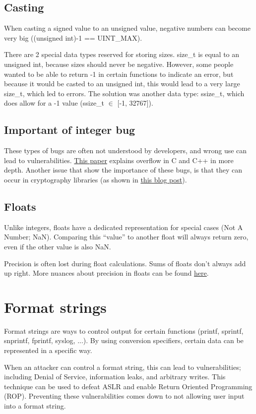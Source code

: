 \documentclass[letterpaper]{article}
\newcommand{\p}{\vspace{1em}\par}		%
\begin{document}
\subsection{Casting}
When casting a signed value to an unsigned value, negative numbers can become very big ((unsigned int)-1 == UINT\_MAX).

\p There are 2 special data types reserved for storing sizes. size\_t is equal to an unsigned int, because sizes should never be negative. However, some people wanted to be able to return -1 in certain functions to indicate an error, but because it would be casted to an unsigned int, this would lead to a very large size\_t, which led to errors. 
The solution was another data type: ssize\_t, which does allow for a -1 value (ssize\_t $\in$ [-1, 32767]).

\subsection{Important of integer bug}
These types of bugs are often not understood by developers, and wrong use can lead to vulnerabilities. \href{http://www.cs.utah.edu/~regehr/papers/overflow12.
pdf
}{This paper} explains overflow in C and C++ in more depth. Another issue that show the importance of these bugs, is that they can occur in cryptography libraries (as shown in \href{http://blog.regehr.org/archives/1054
}{this blog post}).

\subsection{Floats}
Unlike integers, floats have a dedicated representation for special cases (Not A Number; NaN). Comparing this ``value'' to another float will always return zero, even if the other value is also NaN.

\p Precision is often lost during float calculations. Sums of floats don't always add up right. More nuances about precision in floats can be found \href{http://floating-point-gui.de/}{here}.

\section{Format strings}
Format strings are ways to control output for certain functions (printf, sprintf,  snprintf, fprintf, syslog, ...). By using conversion specifiers, certain data can be represented in a specific way.

\p When an attacker can control a format string, this can lead to vulnerabilities; including Denial of Service, information leaks, and arbitrary writes. This technique can be used to defeat ASLR and enable Return Oriented Programming (ROP). 
Preventing these vulnerabilities comes down to not allowing user input into a format string.
\end{document}
